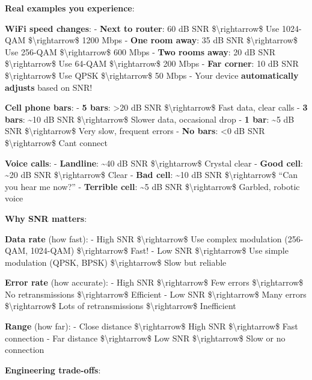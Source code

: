 \textbf{Real examples you experience}:

\textbf{WiFi speed changes}: - \textbf{Next to router}: 60 dB SNR
\$\textbackslash rightarrow\$ Use 1024-QAM \$\textbackslash rightarrow\$
1200 Mbps - \textbf{One room away}: 35 dB SNR
\$\textbackslash rightarrow\$ Use 256-QAM \$\textbackslash rightarrow\$
600 Mbps - \textbf{Two rooms away}: 20 dB SNR
\$\textbackslash rightarrow\$ Use 64-QAM \$\textbackslash rightarrow\$
200 Mbps - \textbf{Far corner}: 10 dB SNR \$\textbackslash rightarrow\$
Use QPSK \$\textbackslash rightarrow\$ 50 Mbps - Your device
\textbf{automatically adjusts} based on SNR!

\textbf{Cell phone bars}: - \textbf{5 bars}: \textgreater20 dB SNR
\$\textbackslash rightarrow\$ Fast data, clear calls - \textbf{3 bars}:
\textasciitilde10 dB SNR \$\textbackslash rightarrow\$ Slower data,
occasional drop - \textbf{1 bar}: \textasciitilde5 dB SNR
\$\textbackslash rightarrow\$ Very slow, frequent errors - \textbf{No
bars}: \textless0 dB SNR \$\textbackslash rightarrow\$
Can\textquotesingle t connect

\textbf{Voice calls}: - \textbf{Landline}: \textasciitilde40 dB SNR
\$\textbackslash rightarrow\$ Crystal clear - \textbf{Good cell}:
\textasciitilde20 dB SNR \$\textbackslash rightarrow\$ Clear -
\textbf{Bad cell}: \textasciitilde10 dB SNR
\$\textbackslash rightarrow\$ ``Can you hear me now?'' -
\textbf{Terrible cell}: \textasciitilde5 dB SNR
\$\textbackslash rightarrow\$ Garbled, robotic voice

\textbf{Why SNR matters}:

\textbf{Data rate} (how fast): - High SNR \$\textbackslash rightarrow\$
Use complex modulation (256-QAM, 1024-QAM) \$\textbackslash rightarrow\$
Fast! - Low SNR \$\textbackslash rightarrow\$ Use simple modulation
(QPSK, BPSK) \$\textbackslash rightarrow\$ Slow but reliable

\textbf{Error rate} (how accurate): - High SNR
\$\textbackslash rightarrow\$ Few errors \$\textbackslash rightarrow\$
No retransmissions \$\textbackslash rightarrow\$ Efficient - Low SNR
\$\textbackslash rightarrow\$ Many errors \$\textbackslash rightarrow\$
Lots of retransmissions \$\textbackslash rightarrow\$ Inefficient

\textbf{Range} (how far): - Close distance \$\textbackslash rightarrow\$
High SNR \$\textbackslash rightarrow\$ Fast connection - Far distance
\$\textbackslash rightarrow\$ Low SNR \$\textbackslash rightarrow\$ Slow
or no connection

\textbf{Engineering trade-offs}:

